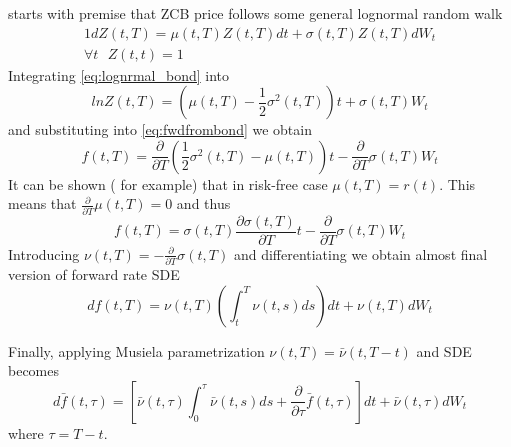 \documentclass[11pt]{article} %
\begin{document}
\cite[ch. 37]{PWoQF06} starts with premise that ZCB price follows some general lognormal random walk
\begin{alignat}{1} \label{eq:lognrmal_bond}
dZ(t,T) = \mu(t,T)Z(t,T)dt + \sigma(t,T)Z(t,T)dW_{t}\\
\forall t \text{ } Z(t,t) = 1 \nonumber
\end{alignat}
Integrating  \eqref{eq:lognrmal_bond} into 
\begin{equation}
lnZ(t,T) = \left(\mu(t,T)-  \frac{1}{2}\sigma^2(t,T)\right)t +\sigma(t,T)W_{t}
\end{equation}
and substituting into \eqref{eq:fwdfrombond} we obtain
\begin{equation}
f(t,T) = \frac{\partial}{\partial T}\left(\frac{1}{2}\sigma ^2(t,T) - \mu(t,T)\right) t-\frac{\partial}{\partial T}\sigma(t,T)W_{t}
\end{equation}
It can be shown (\cite[par. 10.3.2]{Shreve08} for example) that in risk-free case $\mu(t,T) = r(t)$. This means that $\frac{\partial}{\partial T} \mu(t,T) = 0$ and thus 
\begin{equation}
f(t,T) = \sigma(t,T)\frac{\partial \sigma(t,T)}{\partial T}t-\frac{\partial}{\partial T}\sigma(t,T)W_{t}
\end{equation}
Introducing $\nu(t,T) = -\frac{\partial}{\partial T}\sigma(t,T)$ and differentiating we obtain almost final version of forward rate SDE
\begin{equation}
df(t,T) = \nu(t,T)\left(\int_{t}^{T}\nu(t,s)ds\right)dt + \nu(t,T)dW_{t} \nonumber
\end{equation} 

Finally, applying Musiela parametrization $\nu(t,T) = \bar{\nu}(t,T-t)$ and SDE becomes
\begin{equation} \label{eq:hjm_musiela}
d\bar{f}(t,\tau) = \left[\bar{\nu}(t,\tau)\int_{0}^{\tau}\bar{\nu}(t,s)ds+ \frac{\partial}{\partial \tau}\bar{f}(t,\tau)\right]dt + \bar{\nu}(t,\tau)dW_{t} 
\end{equation}
where $\tau = T-t$.

\end{document}
